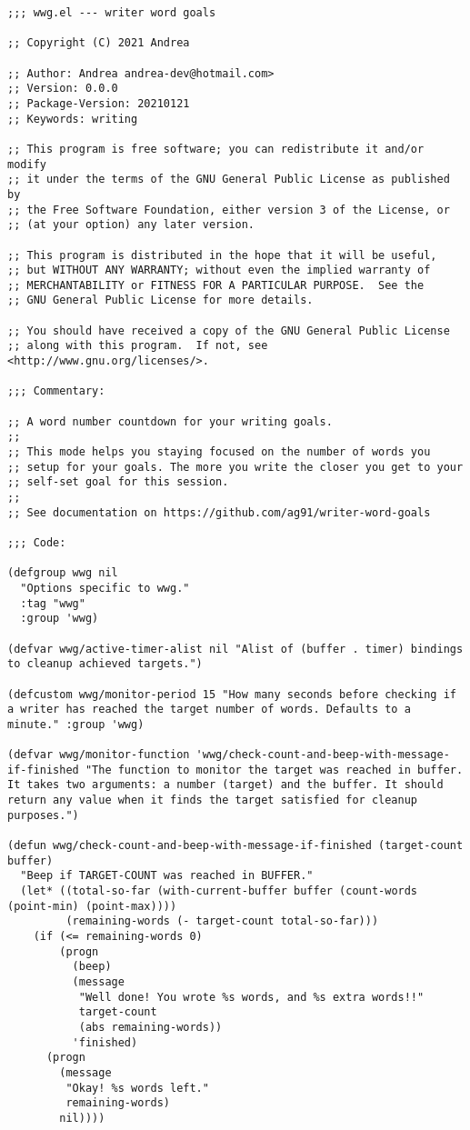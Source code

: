\documentclass[8pt]{article}
\begin{document}
\begin{verbatim}
;;; wwg.el --- writer word goals

;; Copyright (C) 2021 Andrea

;; Author: Andrea andrea-dev@hotmail.com>
;; Version: 0.0.0
;; Package-Version: 20210121
;; Keywords: writing

;; This program is free software; you can redistribute it and/or modify
;; it under the terms of the GNU General Public License as published by
;; the Free Software Foundation, either version 3 of the License, or
;; (at your option) any later version.

;; This program is distributed in the hope that it will be useful,
;; but WITHOUT ANY WARRANTY; without even the implied warranty of
;; MERCHANTABILITY or FITNESS FOR A PARTICULAR PURPOSE.  See the
;; GNU General Public License for more details.

;; You should have received a copy of the GNU General Public License
;; along with this program.  If not, see <http://www.gnu.org/licenses/>.

;;; Commentary:

;; A word number countdown for your writing goals.
;;
;; This mode helps you staying focused on the number of words you
;; setup for your goals. The more you write the closer you get to your
;; self-set goal for this session.
;;
;; See documentation on https://github.com/ag91/writer-word-goals

;;; Code:

(defgroup wwg nil
  "Options specific to wwg."
  :tag "wwg"
  :group 'wwg)

(defvar wwg/active-timer-alist nil "Alist of (buffer . timer) bindings to cleanup achieved targets.")

(defcustom wwg/monitor-period 15 "How many seconds before checking if a writer has reached the target number of words. Defaults to a minute." :group 'wwg)

(defvar wwg/monitor-function 'wwg/check-count-and-beep-with-message-if-finished "The function to monitor the target was reached in buffer. It takes two arguments: a number (target) and the buffer. It should return any value when it finds the target satisfied for cleanup purposes.")

(defun wwg/check-count-and-beep-with-message-if-finished (target-count buffer)
  "Beep if TARGET-COUNT was reached in BUFFER."
  (let* ((total-so-far (with-current-buffer buffer (count-words (point-min) (point-max))))
         (remaining-words (- target-count total-so-far)))
    (if (<= remaining-words 0)
        (progn
          (beep)
          (message
           "Well done! You wrote %s words, and %s extra words!!"
           target-count
           (abs remaining-words))
          'finished)
      (progn
        (message
         "Okay! %s words left."
         remaining-words)
        nil))))


\end{verbatim}
\end{document}
